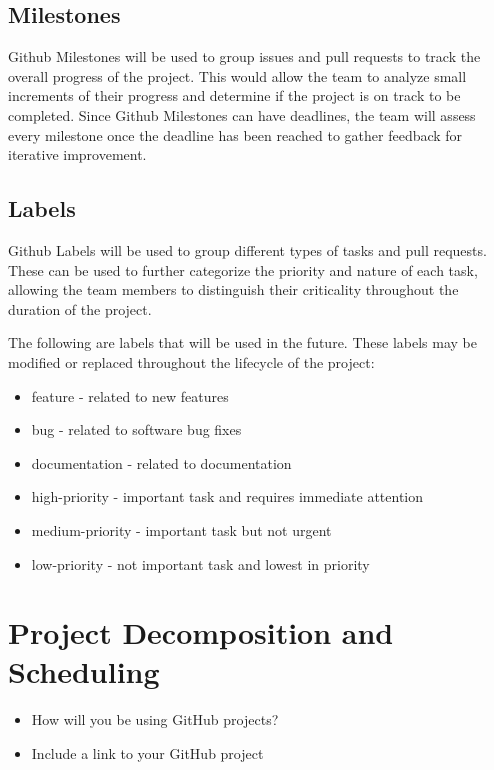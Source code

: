 \documentclass{article}
\begin{document}
\subsection{Milestones}
Github Milestones will be used to group issues and pull requests to track the overall progress of the project. This would allow the team to analyze small increments of their progress and determine if the project is on track to be completed. Since Github Milestones can have deadlines, the team will assess every milestone once the deadline has been reached to gather feedback for iterative improvement.

\subsection{Labels}
Github Labels will be used to group different types of tasks and pull requests. These can be used to further categorize the priority and nature of each task, allowing the team members to distinguish their criticality throughout the duration of the project.

\vspace{10pt}

\noindent The following are labels that will be used in the future. These labels may be modified or replaced throughout the lifecycle of the project:

\begin{itemize}
  \item feature - related to new features
  \item bug - related to software bug fixes
  \item documentation - related to documentation
  \item high-priority - important task and requires immediate attention
  \item medium-priority - important task but not urgent
  \item low-priority - not important task and lowest in priority
\end{itemize}

\section{Project Decomposition and Scheduling}

\begin{itemize}
  \item How will you be using GitHub projects?
  \item Include a link to your GitHub project
\end{itemize}
\end{document}
